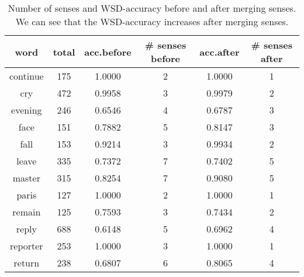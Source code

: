 \begin{table}
\centering
\caption{Number of senses and WSD-accuracy before and after merging senses. We can see that the WSD-accuracy increases after merging senses.}
\label{tab:wsd_table}
\begin{tabular}{c|c|c|c|c|c}
\toprule
    \textbf{word} &  \textbf{total} & \textbf{acc.before} & \textbf{\# senses before} & \textbf{acc.after} & \textbf{\# senses after} \\
\midrule
         continue &             175 &              1.0000 &                         2 &             1.0000 &                        1 \\
              cry &             472 &              0.9958 &                         3 &             0.9979 &                        2 \\
          evening &             246 &              0.6546 &                         4 &             0.6787 &                        3 \\
             face &             151 &              0.7882 &                         5 &             0.8147 &                        3 \\
             fall &             153 &              0.9214 &                         3 &             0.9934 &                        2 \\
            leave &             335 &              0.7372 &                         7 &             0.7402 &                        5 \\
           master &             315 &              0.8254 &                         7 &             0.9080 &                        5 \\
            paris &             127 &              1.0000 &                         2 &             1.0000 &                        1 \\
           remain &             125 &              0.7593 &                         3 &             0.7434 &                        2 \\
            reply &             688 &              0.6148 &                         5 &             0.6962 &                        4 \\
         reporter &             253 &              1.0000 &                         3 &             1.0000 &                        1 \\
           return &             238 &              0.6807 &                         6 &             0.8065 &                        4 \\

\end{tabular}
\end{table}
